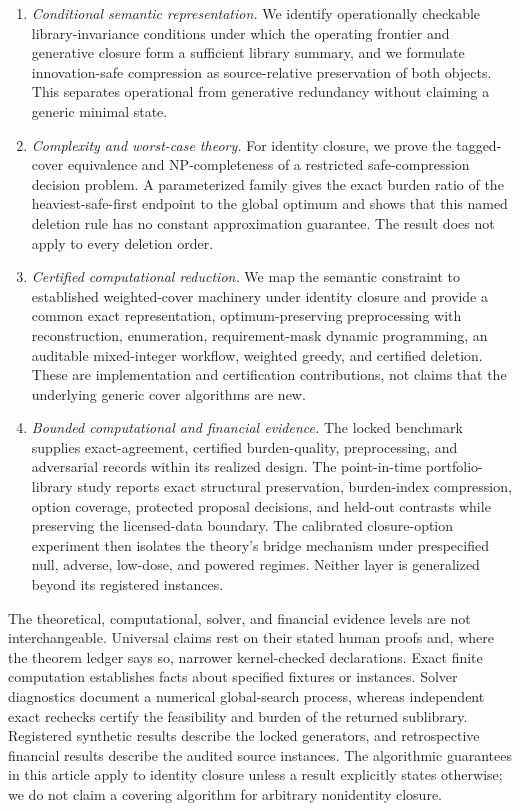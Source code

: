 \begin{enumerate}
\item \emph{Conditional semantic representation.} We identify operationally
checkable library-invariance conditions under which the operating frontier and
generative closure form a sufficient library summary, and we formulate
innovation-safe compression as source-relative preservation of both objects.
This separates operational from generative redundancy without claiming a
generic minimal state.

\item \emph{Complexity and worst-case theory.} For identity closure, we prove
the tagged-cover equivalence and NP-completeness of a restricted safe-compression
decision problem. A parameterized family gives the exact burden ratio of the
heaviest-safe-first endpoint to the global optimum and shows that this named
deletion rule has no constant approximation guarantee. The result does not
apply to every deletion order.

\item \emph{Certified computational reduction.} We map the semantic constraint
to established weighted-cover machinery under identity closure and provide a
common exact representation, optimum-preserving preprocessing with
reconstruction, enumeration, requirement-mask dynamic programming, an
auditable mixed-integer workflow, weighted greedy, and certified deletion.
These are implementation and certification contributions, not claims that the
underlying generic cover algorithms are new.

\item \emph{Bounded computational and financial evidence.} The locked
benchmark supplies exact-agreement, certified burden-quality, preprocessing,
and adversarial records within its realized design. The point-in-time
portfolio-library study reports exact structural preservation, burden-index
compression, option coverage, protected proposal decisions, and held-out
contrasts while preserving the licensed-data boundary. The calibrated
closure-option experiment then isolates the theory's bridge mechanism under
prespecified null, adverse, low-dose, and powered regimes. Neither layer is
generalized beyond its registered instances.
\end{enumerate}

The theoretical, computational, solver, and financial evidence levels are not
interchangeable. Universal claims rest on their stated human proofs and, where
the theorem ledger says so, narrower kernel-checked declarations. Exact finite
computation establishes facts about specified fixtures or instances. Solver
diagnostics document a numerical global-search process, whereas independent
exact rechecks certify the feasibility and burden of the returned sublibrary.
Registered synthetic results describe the locked generators, and retrospective
financial results describe the audited source instances. The algorithmic
guarantees in this article apply to identity closure unless a result explicitly
states otherwise; we do not claim a covering algorithm for arbitrary
nonidentity closure.

